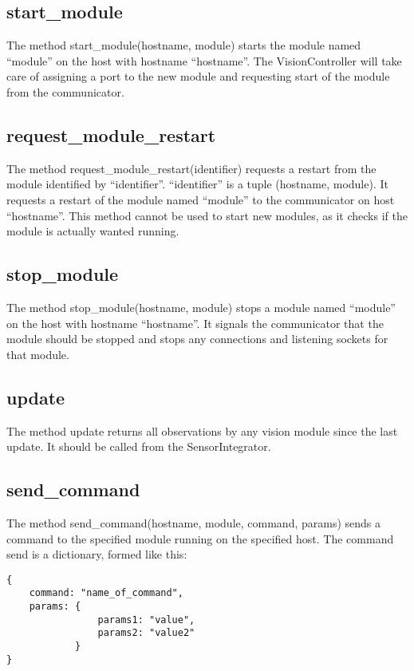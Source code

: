 \documentclass[a4paper, 10pt, oneside]{article}
\begin{document}
\subsection{start\_module}
The method start\_module(hostname, module) starts the module named ``module'' on
the host with hostname ``hostname''. The VisionController will take care of
assigning a port to the new module and requesting start of the module from the
communicator. \\

\subsection{request\_module\_restart}
The method request\_module\_restart(identifier) requests a restart from the module
identified by ``identifier''. ``identifier'' is a tuple (hostname, module). It
requests a restart of the module named ``module'' to the communicator on host
``hostname''. This method cannot be used to start new modules, as it checks if
the module is actually wanted running. \\

\subsection{stop\_module}
The method stop\_module(hostname, module) stops a module named ``module'' on the
host with hostname ``hostname''. It signals the communicator that the module
should be stopped and stops any connections and listening sockets for that
module. \\

\subsection{update}
The method update returns all observations by any vision module since the last
update. It should be called from the SensorIntegrator. \\

\subsection{send\_command}
The method send\_command(hostname, module, command, params) sends a command to
the specified module running on the specified host. The command send is a
dictionary, formed like this:

\begin{lstlisting}
{
    command: "name_of_command",
    params: {
                params1: "value",
                params2: "value2"
            }
}
\end{lstlisting}
\end{document}
